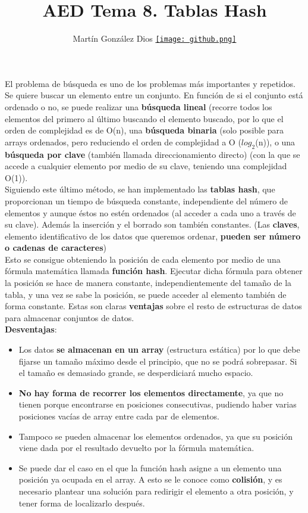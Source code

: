 \documentclass{article}
\title{AED Tema 8. Tablas Hash}
\author{Martín González Dios 
\href{https://github.com/martindios}{\texttt{[image: github.png]}}}
\begin{document}
\maketitle

El problema de búsqueda es uno de los problemas más importantes y repetidos. Se quiere buscar un elemento entre un conjunto. En función de si el conjunto está ordenado o no, se puede
realizar una \textbf{búsqueda lineal} (recorre todos los elementos del primero al último buscando el
elemento buscado, por lo que el orden de complejidad es de O(n), una \textbf{búsqueda binaria}
(solo posible para arrays ordenados, pero reduciendo el orden de complejidad a O ($log_2$(n)), o
una \textbf{búsqueda por clave} (también llamada direccionamiento directo) (con la que se accede a cualquier elemento por medio de su clave, teniendo una complejidad O(1)). \\

Siguiendo este último método, se han implementado las \textbf{tablas hash}, que proporcionan un
tiempo de búsqueda constante, independiente del número de elementos y aunque éstos no estén
ordenados (al acceder a cada uno a través de su clave). Además la inserción y el borrado son también constantes. (Las \textbf{claves}, elemento identificativo de los datos que queremos ordenar, \textbf{pueden ser número o cadenas de caracteres}) \\

Esto se consigue obteniendo la posición de cada elemento por medio de una fórmula matemática
llamada \textbf{función hash}. Ejecutar dicha fórmula para obtener la posición se hace de manera
constante, independientemente del tamaño de la tabla, y una vez se sabe la posición, se puede
acceder al elemento también de forma constante. Estas son claras \textbf{ventajas} sobre el resto de
estructuras de datos para almacenar conjuntos de datos. \\

\textbf{Desventajas}: 
\begin{itemize}
    \item Los datos \textbf{se almacenan en un array} (estructura estática) por lo que debe fijarse un tamaño máximo desde el principio, que no se podrá sobrepasar. Si el tamaño es demasiado grande, se desperdiciará mucho espacio.

    \item \textbf{No hay forma de recorrer los elementos directamente}, ya que no tienen porque encontrarse en posiciones consecutivas, pudiendo haber varias posiciones vacías de array entre cada par de elementos.

    \item Tampoco se pueden almacenar los elementos ordenados, ya que su posición viene dada
    por el resultado devuelto por la fórmula matemática.

    \item Se puede dar el caso en el que la función hash asigne a un elemento una posición ya
    ocupada en el array. A esto se le conoce como \textbf{colisión}, y es necesario plantear una
    solución para redirigir el elemento a otra posición, y tener forma de localizarlo después.
\end{itemize}
\end{document}
